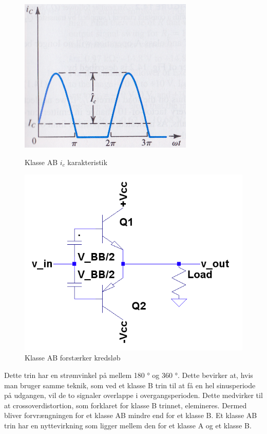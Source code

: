 \begin{figure}[ht]
\begin{minipage}[b]{0.5\linewidth}
\centering
\includegraphics[scale=.35]{valg_af_loesning/klasser/klasseab.png}
\caption{Klasse AB $i_c$ karakteristik}
\label{fig:klasseab}
\end{minipage}
\hspace{0.5cm}
\begin{minipage}[b]{0.5\linewidth}
\centering
\includegraphics[scale=.35]{valg_af_loesning/klasser/classab.png}
\caption{Klasse AB forstærker kredsløb}
\label{fig:classab}
\end{minipage}
\end{figure}


Dette trin har en strømvinkel på mellem 180 ° og 360 °. Dette bevirker at, hvis man bruger samme teknik, som ved et klasse B trin til at få en hel sinusperiode på udgangen, vil de to signaler overlappe i overgangsperioden. Dette medvirker til at crossoverdistortion, som forklaret for klasse B trinnet, elemineres. Dermed bliver forvrængningen for et klasse AB mindre end for et klasse B.
Et klasse AB trin har en nyttevirkning som ligger mellem den for et klasse A og et klasse B. 

